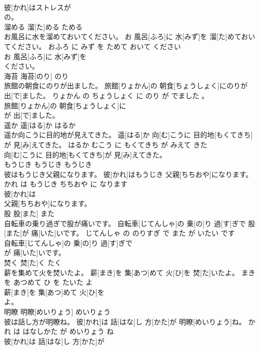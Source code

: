 \documentclass[8pt]{extreport}
\begin{document}
\begin{CJK}{UTF8}{min}
\\	彼[かれ]はストレスが
\\	の。			
\\	溜める	溜[た]める	ためる	
\\	お風呂に水を溜めておいてください。	お 風呂[ふろ]に 水[みず]を 溜[た]めておいてください。	おふろ に みず を ためて おいて ください	
\\	お 風呂[ふろ]に 水[みず]を
\\	ください。			
\\	海苔	海苔[のり]	のり	
\\	旅館の朝食にのりが出ました。	旅館[りょかん]の 朝食[ちょうしょく]にのりが 出[で]ました。	りょかん の ちょうしょく に のり が でました 。	
\\	旅館[りょかん]の 朝食[ちょうしょく]に
\\	が 出[で]ました。			
\\	遥か	遥[はる]か	はるか	
\\	遥か向こうに目的地が見えてきた。	遥[はる]か 向[む]こうに 目的地[もくてきち]が 見[み]えてきた。	はるか むこう に もくてきち が みえて きた	
\\	向[む]こうに 目的地[もくてきち]が 見[み]えてきた。			
\\	もうじき	もうじき	もうじき	
\\	彼はもうじき父親になります。	彼[かれ]はもうじき 父親[ちちおや]になります。	かれ は もうじき ちちおや に なります	
\\	彼[かれ]は
\\	父親[ちちおや]になります。			
\\	股	股[また]	また	
\\	自転車の乗り過ぎで股が痛いです。	自転車[じてんしゃ]の 乗[の]り 過[す]ぎで 股[また]が 痛[いた]いです。	じてんしゃ の のりすぎ で また が いたい です	
\\	自転車[じてんしゃ]の 乗[の]り 過[す]ぎで
\\	が 痛[いた]いです。			
\\	焚く	焚[た]く	たく	
\\	薪を集めて火を焚いたよ。	薪[まき]を 集[あつ]めて 火[ひ]を 焚[た]いたよ。	まき を あつめて ひ を たいた よ	
\\	薪[まき]を 集[あつ]めて 火[ひ]を
\\	よ。			
\\	明瞭	明瞭[めいりょう]	めいりょう	
\\	彼は話し方が明瞭ね。	彼[かれ]は 話[はな]し 方[かた]が 明瞭[めいりょう]ね。	かれ は はなしかた が めいりょう ね	
\\	彼[かれ]は 話[はな]し 方[かた]が

\end{CJK}
\end{document}
